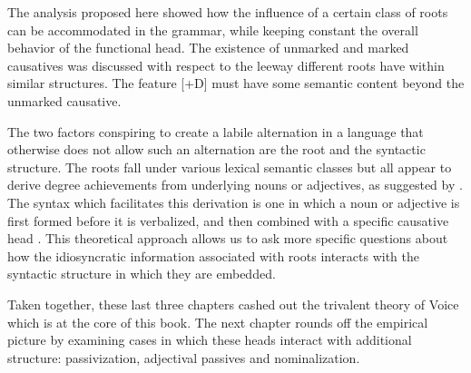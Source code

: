 
The analysis proposed here showed how the influence of a certain class of roots can be accommodated in the grammar, while keeping constant the overall behavior of the functional head. The existence of unmarked and marked causatives was discussed with respect to the leeway different roots have within similar structures. The feature [+D] must have some semantic content beyond the unmarked causative. 

The two factors conspiring to create a labile alternation in a language that otherwise does not allow such an alternation are the root and the syntactic structure. The roots fall under various lexical semantic classes but all appear to derive degree achievements from underlying nouns or adjectives, as suggested by \cite{lev16}. The syntax which facilitates this derivation is one in which a noun or adjective is first formed before it is verbalized, and then combined with a specific causative head {\vd}. This theoretical approach allows us to ask more specific questions about how the idiosyncratic information associated with roots interacts with the syntactic structure in which they are embedded.

Taken together, these last three chapters cashed out the trivalent theory of Voice which is at the core of this book. The next chapter rounds off the empirical picture by examining cases in which these heads interact with additional structure: passivization, adjectival passives and nominalization.



